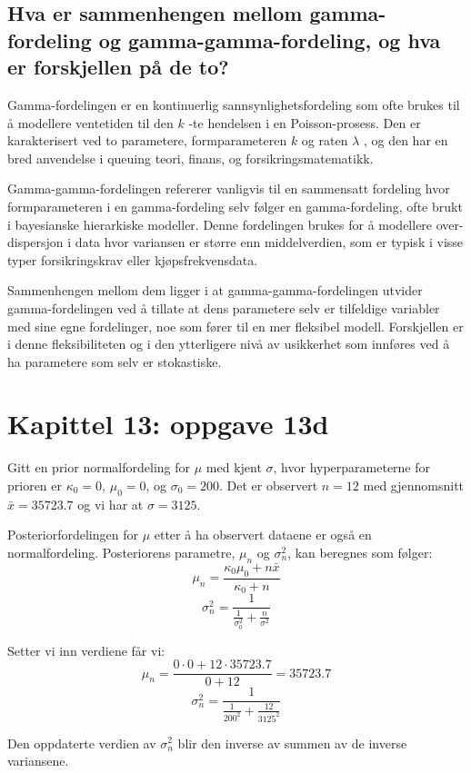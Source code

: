 \documentclass[12pt]{article}
\begin{document}
\subsection{Hva er sammenhengen mellom gamma-fordeling og gamma-gamma-fordeling,
og hva er forskjellen på de to?}

Gamma-fordelingen er en kontinuerlig sannsynlighetsfordeling som ofte brukes til å modellere ventetiden til den 
\({k}\) -te hendelsen i en Poisson-prosess. Den er karakterisert ved to parametere, formparameteren 
\({k}\) og raten 
\({\lambda}\) , og den har en bred anvendelse i queuing teori, finans, og forsikringsmatematikk.


Gamma-gamma-fordelingen refererer vanligvis til en sammensatt fordeling hvor formparameteren i en gamma-fordeling selv følger en gamma-fordeling, 
ofte brukt i bayesianske hierarkiske modeller. Denne fordelingen brukes for å modellere over-dispersjon i data hvor variansen er større enn middelverdien, 
som er typisk i visse typer forsikringskrav eller kjøpsfrekvensdata.

Sammenhengen mellom dem ligger i at gamma-gamma-fordelingen utvider gamma-fordelingen ved å tillate at dens parametere selv er tilfeldige variabler
 med sine egne fordelinger, noe som fører til en mer fleksibel modell. Forskjellen er i denne fleksibiliteten og i den ytterligere nivå av usikkerhet som innføres ved å ha parametere som selv er stokastiske.
\section{Kapittel 13: oppgave 13d}

Gitt en prior normalfordeling for \(\mu\) med kjent \(\sigma\), hvor hyperparameterne for prioren er \(\kappa_0 = 0\), \(\mu_0 = 0\), og \(\sigma_0 = 200\). Det er observert \(n = 12\) med gjennomsnitt \(\bar{x} = 35723.7\) og vi har at \(\sigma = 3125\).

Posteriorfordelingen for \(\mu\) etter å ha observert dataene er også en normalfordeling. Posteriorens parametre, \(\mu_n\) og \(\sigma_n^2\), kan beregnes som følger:
\[\mu_n = \frac{\kappa_0\mu_0 + n\bar{x}}{\kappa_0 + n}\]
\[\sigma_n^2 = \frac{1}{\frac{1}{\sigma_0^2} + \frac{n}{\sigma^2}}\]

Setter vi inn verdiene får vi:
\[\mu_n = \frac{0 \cdot 0 + 12 \cdot 35723.7}{0 + 12} = 35723.7\]
\[\sigma_n^2 = \frac{1}{\frac{1}{200^2} + \frac{12}{3125^2}}\]

Den oppdaterte verdien av \(\sigma_n^2\) blir den inverse av summen av de inverse variansene.
\end{document}
